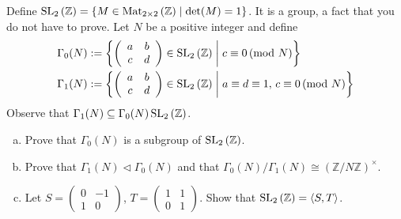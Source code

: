 \documentclass[10pt]{amsart}
\begin{document}
\begin{thm}
  Define $\operatorname{SL}_2\left(\mathbb{Z}\right) = \left\{ M \in \operatorname{Mat}_{2 \times 2}\left(\mathbb{Z}\right) \mid \det(M) = 1 \right\}$.
  It is a group, a fact that you do not have to prove.
  Let $N$ be a positive integer and define
  \begin{align*}
    \Gamma_0(N) & := \left\{ \left(
    \begin{array}{cc}
      a & b\\
      c & d
    \end{array}
    \right) \in \operatorname{SL}_2\left(\mathbb{Z}\right)
    \;\middle\vert\; c \equiv 0\, (\text{mod } N)
    \right\}\\
    \Gamma_1(N) & := \left\{ \left(
    \begin{array}{cc}
      a & b\\
      c & d
    \end{array}
    \right) \in \operatorname{SL}_2\left(\mathbb{Z}\right)
    \;\middle\vert\; a \equiv d \equiv 1,\, c \equiv 0\, (\text{mod } N)
    \right\}\\
  \end{align*}
  Observe that $\Gamma_1(N) \subseteq \Gamma_0(N) \operatorname{SL}_2\left(\mathbb{Z}\right)$.
  \begin{enumerate}[(a)]
  \item
    Prove that $\Gamma_0(N)$ is a subgroup of $\operatorname{SL}_2\left(\mathbb{Z}\right)$.
  \item
    Prove that $\Gamma_1(N) \lhd \Gamma_0(N)$ and that $\Gamma_0(N) / \Gamma_1(N) \cong (\mathbb{Z}/N\mathbb{Z})^{\times}$.
  \item
    Let $S = \left(
    \begin{array}{cc}
      0 & -1\\
      1 & 0
    \end{array}
    \right)$,
    $T = \left(
    \begin{array}{cc}
      1 & 1\\
      0 & 1
    \end{array}
    \right)$.
    Show that $\operatorname{SL}_2\left(\mathbb{Z}\right) = \left<S,T\right>$.
  \end{enumerate}
  

\end{thm}
\end{document}
